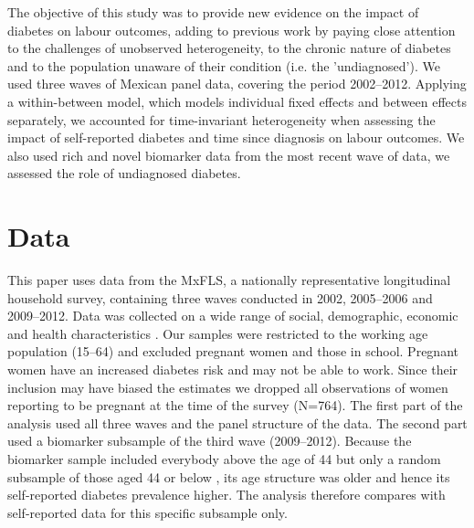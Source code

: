 \documentclass[12pt,english]{article}
\begin{document}
The objective of this study was to provide new evidence on the impact of diabetes on labour outcomes, adding to previous work by paying close attention to the challenges of unobserved heterogeneity, to the chronic nature of diabetes and to the population unaware of their condition (i.e. the 'undiagnosed'). We used three waves of Mexican panel data, covering the period 2002--2012. Applying a within-between model, which  models individual fixed effects and between effects separately, we accounted for time-invariant heterogeneity when assessing the impact of self-reported diabetes and time since diagnosis on labour outcomes. We also used rich and novel biomarker data from the most recent wave of data, we assessed the role of undiagnosed diabetes.

\section{\label{sec:Data}Data}

This paper uses data from the \acf{MxFLS}, a nationally representative longitudinal household survey, containing three waves conducted in 2002, 2005--2006 and 2009--2012. Data was collected on a wide range of social, demographic, economic and health characteristics \parencite{Rubalcava2013}. Our samples were restricted to the working age population (15--64) and excluded pregnant women and those in school. Pregnant women have an increased diabetes risk and may not be able to work. Since their inclusion may have biased the estimates we dropped all observations of women reporting to be pregnant at the time of the survey (N=764). The first part of the analysis used all three waves and the panel structure of the data. The second part used a biomarker subsample of the third wave (2009--2012). Because the biomarker sample included everybody above the age of 44 but only a random subsample of those aged 44 or below \parencite{Crimmins2015}, its age structure was older and hence its self-reported diabetes prevalence higher. The analysis therefore compares with self-reported data for this specific subsample only.
\end{document}
